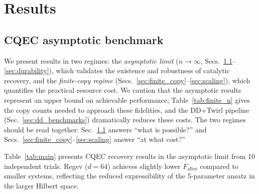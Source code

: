 \documentclass[a4paper,twocolumn]{quantumarticle}
\begin{document}
\section{Results}
\label{sec:results}

\subsection{CQEC asymptotic benchmark}
\label{sec:main_results}

We present results in two regimes: the \emph{asymptotic limit} ($n \to \infty$, Secs.~\ref{sec:main_results}--\ref{sec:durability}), which validates the existence and robustness of catalytic recovery, and the \emph{finite-copy regime} (Secs.~\ref{sec:finite_copy}--\ref{sec:scaling}), which quantifies the practical resource cost.
We caution that the asymptotic results represent an upper bound on achievable performance; Table~\ref{tab:finite_n} gives the copy counts needed to approach these fidelities, and the DD+Twirl pipeline (Sec.~\ref{sec:dd_benchmarks}) dramatically reduces these costs.
The two regimes should be read together: Sec.~\ref{sec:main_results} answers ``what is possible?'' and Secs.~\ref{sec:finite_copy}--\ref{sec:scaling} answer ``at what cost?''

Table~\ref{tab:main} presents CQEC recovery results in the asymptotic limit from 10 independent trials.
Regev ($d = 64$) achieves slightly lower $F_\mathrm{after}$ compared to smaller systems, reflecting the reduced expressibility of the 5-parameter ansatz in the larger Hilbert space.
\end{document}
